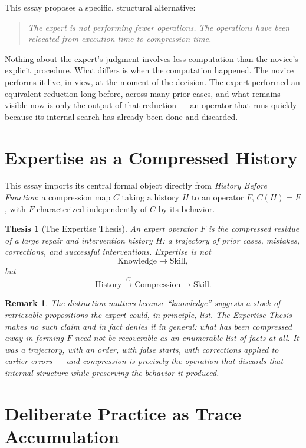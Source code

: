 \documentclass[11pt]{article}
\newtheorem{thesis}[definition]{Thesis}
\newtheorem*{remark}{Remark}
\begin{document}
This essay proposes a specific, structural alternative:

\begin{quote}
\itshape The expert is not performing fewer operations. The operations have been relocated from execution-time to compression-time.
\end{quote}

Nothing about the expert's judgment involves less computation than the novice's explicit procedure. What differs is when the computation happened. The novice performs it live, in view, at the moment of the decision. The expert performed an equivalent reduction long before, across many prior cases, and what remains visible now is only the output of that reduction — an operator that runs quickly because its internal search has already been done and discarded.

\section{Expertise as a Compressed History}

This essay imports its central formal object directly from \emph{History Before Function}: a compression map $C$ taking a history $H$ to an operator $F$, $C(H)=F$, with $F$ characterized independently of $C$ by its behavior.

\begin{thesis}[The Expertise Thesis]
An expert operator $F$ is the compressed residue of a large repair and intervention history $H$: a trajectory of prior cases, mistakes, corrections, and successful interventions. Expertise is not
\[
\text{Knowledge} \longrightarrow \text{Skill},
\]
but
\[
\text{History} \xrightarrow{\;C\;} \text{Compression} \longrightarrow \text{Skill}.
\]
\end{thesis}

\begin{remark}
The distinction matters because ``knowledge'' suggests a stock of retrievable propositions the expert could, in principle, list. The Expertise Thesis makes no such claim and in fact denies it in general: what has been compressed away in forming $F$ need not be recoverable as an enumerable list of facts at all. It was a trajectory, with an order, with false starts, with corrections applied to earlier errors — and compression is precisely the operation that discards that internal structure while preserving the behavior it produced.
\end{remark}

\section{Deliberate Practice as Trace Accumulation}
\end{document}

